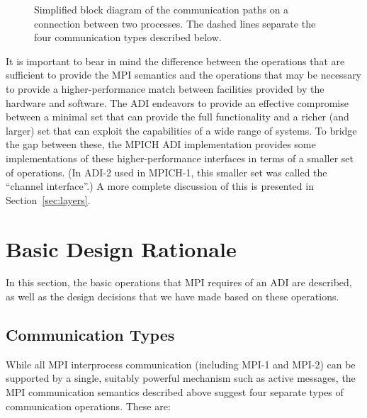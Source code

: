 \begin{figure}
\centerline{}
\caption{Simplified block diagram of the communication paths on a connection
  between two processes.  The dashed lines separate the four communication
  types described below.} 
\label{fig:adi-overview}
\end{figure}

It is important to bear in mind the difference between the operations that are
sufficient to provide the MPI semantics and the operations that may be
necessary to provide a higher-performance match between facilities
provided by the hardware and software.  The ADI endeavors to provide
an effective compromise between a minimal set that can provide the
full functionality and a richer (and larger) set that can exploit the
capabilities of a wide range of systems.  To bridge the gap between
these, the MPICH ADI implementation provides some implementations of
these higher-performance interfaces in terms of a smaller set of
operations.  (In ADI-2 used in MPICH-1, this smaller set was called
the ``channel interface''.)  A more complete discussion of this is
presented in Section~\ref{sec:layers}.

\section{Basic Design Rationale}
\label{sec:basic-design}
In this section, the basic operations that MPI requires of an ADI are
described, as well as the design decisions that we have made based on these
operations.

\subsection{Communication Types}
\label{sec:comm-types}

While all MPI interprocess communication (including MPI-1 and MPI-2)
can be supported by a single, suitably powerful mechanism such as
active messages, the MPI communication semantics described above
suggest four separate types of communication operations.  These are:

